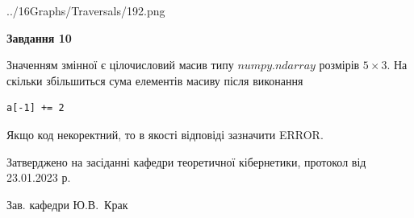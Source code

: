 \documentclass[12pt, ukrainian]{article}
\begin{document}
{\begin {large}
\begin{center}
	{../16Graphs/Traversals/192.png}
\end{center}\par
\newpage

{\begin {center}\textbf{Завдання 10}\end {center}}\par
Значенням змінної  є цілочисловий масив типу $numpy.ndarray$ розмірів $5{\times}3$. На скільки збільшиться сума елементів масиву  після виконання
\begin{verbatim}
a[-1] += 2
\end{verbatim}


Якщо код некоректний, то в якості відповіді зазначити ERROR.\par
\newpage


\end {large}
}
{\smallskip \begin {small} Затверджено на засіданні кафедри теоретичної кібернетики, протокол  від   23.01.2023 р.\par\smallskip\smallskip
{\parbox {6.5 cm}{Зав. кафедри \dotfill Ю.В.~Крак}} \end{small}}
\end{document}
